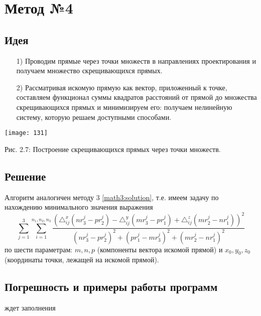 \section{Метод №4}\label{meth4}

\subsection{Идея}\label{math4:idea}

\begin{itemize}
	\item[1)] Проводим прямые через точки множеств в направлениях проектирования и получаем множество скрещивающихся прямых.
	\item[2)] Рассматривая искомую прямую как вектор, приложенный к точке, составляем функционал суммы квадратов расстояний от прямой до множества скрещивающихся прямых и минимизируем его: получаем нелинейную систему, которую решаем доступными способами.
	
\end{itemize}

\vspace{0.5cm}
\begin{center}
	\texttt{[image: 131]}

	Рис. 2.7: Построение скрещивающихся прямых через точки множеств.
\end{center}

\newpage
\subsection{Решение}\label{math4:solution}

Алгоритм аналогичен методу 3 \ref{math3:solution}, т.е. имеем задачу по нахождению минимального значения выражения
$$\underset{j=1}{\overset{3}{\sum}} \underset{i=1}{\overset{n_1, n_2, n_3}{\sum}}
\frac{\left(\triangle_{ij}^x (n r_3^j - p r_2^j) - \triangle_{ij}^y (m r_3^j - p r_1^j) + \triangle_{ij}^z (m r_2^j - n r_1^j)\right)^2}{(n r_3^j - p r_2^j)^2 + (p r_1^j - m r_3^j)^2 + (m r_2^j - n r_1^j)^2}$$
по шести параметрам: $m,n,p$ (компоненты вектора искомой прямой) и $x_0, y_0, z_0$ (координаты точки, лежащей на искомой прямой).

\subsection{Погрешность и примеры работы программ}\label{math4:error}

ждет заполнения

